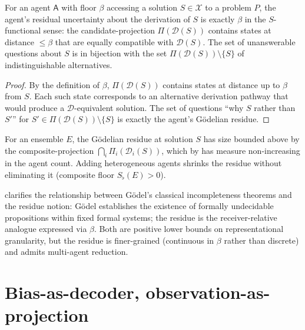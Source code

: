 \documentclass[11pt,twocolumn,a4paper]{article}
\newcommand{\D}{\mathcal{D}}
\newcommand{\X}{\mathcal{X}}
\newcommand{\agent}{\mathsf{A}}
\newcommand{\Sfloor}{S_{\flat}}
\begin{document}
\begin{theorem}\label{thm:resid-floor}
For an agent $\agent$ with floor $\beta$ accessing a solution
$S\in\X$ to a problem $P$, the agent's residual uncertainty about
the derivation of $S$ is exactly $\beta$ in the $S$-functional sense:
the candidate-projection $\Pi(\D(S))$ contains states at distance
$\le\beta$ that are equally compatible with $\D(S)$. The set of
unanswerable questions about $S$ is in bijection with the set
$\Pi(\D(S))\setminus\{S\}$ of indistinguishable alternatives.
\end{theorem}

\begin{proof}
By the definition of $\beta$, $\Pi(\D(S))$ contains states at distance
up to $\beta$ from $S$. Each such state corresponds to an alternative
derivation pathway that would produce a $\D$-equivalent solution. The
set of questions ``why $S$ rather than $S'$'' for $S'\in\Pi(\D(S))
\setminus\{S\}$ is exactly the agent's Gödelian residue.
\end{proof}

\begin{corollary}\label{cor:resid-ens}
For an ensemble $E$, the Gödelian residue at solution $S$ has size
bounded above by the composite-projection
$\bigcap_i\Pi_i(\D_i(S))$, which by  has measure
non-increasing in the agent count. Adding heterogeneous agents
shrinks the residue without eliminating it (composite floor
$\Sfloor(E)>0$).
\end{corollary}

\begin{remark}\label{rem:godel-vs-residue}
 clarifies the relationship between Gödel's
classical incompleteness theorems and the residue notion: Gödel
establishes the existence of formally undecidable propositions within
fixed formal systems; the residue is the receiver-relative analogue
expressed via $\beta$. Both are positive lower bounds on
representational granularity, but the residue is finer-grained
(continuous in $\beta$ rather than discrete) and admits multi-agent
reduction.
\end{remark}

\section{Bias-as-decoder, observation-as-projection}
\label{sec:bias}
\end{document}
